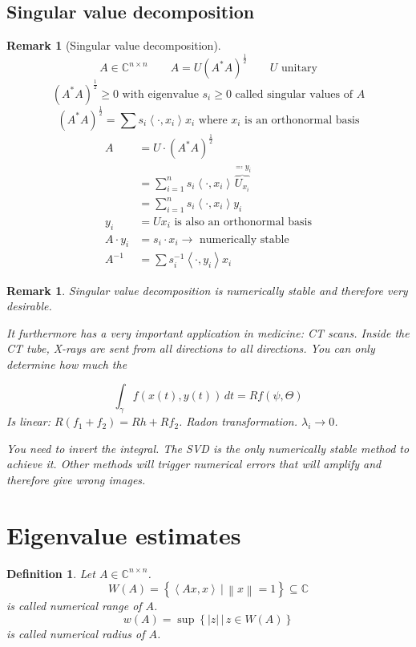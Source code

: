 \documentclass{article}
\newcounter{lecref}[section]
\numberwithin{lecref}{section}
\newtheorem{definition}[lecref]{Definition}
\newtheorem{remark}[lecref]{Remark}
\newcommand{\setdef}[2]{\left\{\left.#1\,\right|\,#2\right\}}
\newcommand{\angel}[1]{\left\langle#1\right\rangle}
\newcommand{\norm}[1]{\left\|#1\right\|}
\newcommand{\card}[1]{\left|#1\right|}
\begin{document}
\subsection{Singular value decomposition}

\begin{remark}[Singular value decomposition]
  \[ A \in \mathbb C^{n \times n} \qquad A = U (A^* A)^{\frac12} \qquad U \text{ unitary} \]
  \[ (A^* A)^{\frac12} \geq 0 \text{ with eigenvalue } s_i \geq 0 \text{ called singular values of } A \]
  \[ (A^* A)^{\frac12} = \sum s_i \angel{\cdot, x_i} x_i \text{ where } x_i \text{ is an orthonormal basis} \]
  \begin{align*}
    A &= U \cdot (A^* A)^{\frac12} \\
      &= \sum_{i=1}^n s_i \angel{\cdot, x_i} \overbrace{U_{x_i}}^{\eqqcolon y_i} \\
      &= \sum_{i=1}^n s_i \angel{\cdot, x_i} y_i \\
    y_i &= U x_i \text{ is also an orthonormal basis} \\
    A \cdot y_i &= s_i \cdot x_i \to \text{ numerically stable} \\
    A^{-1} &= \sum s^{-1}_i \angel{\cdot, y_i} x_i
  \end{align*}
\end{remark}

\begin{remark}
  Singular value decomposition is numerically stable and therefore very desirable.

  It furthermore has a very important application in medicine: CT scans.
  Inside the CT tube, X-rays are sent from all directions to all directions.
  You can only determine how much the 

  \[ \int_{\gamma} f(x(t), y(t)) \,dt = Rf(\psi, \Theta) \]
  Is linear: $R(f_1 + f_2) = Rh + Rf_2$.
  Radon transformation. $\lambda_i \to 0$.

  You need to invert the integral. The SVD is the only numerically stable method to achieve it. Other methods will trigger numerical errors that will amplify and therefore give wrong images.
\end{remark}

\section{Eigenvalue estimates} %

\begin{definition} %
  Let $A \in \mathbb C^{n \times n}$.
  \[ W(A) = \setdef{\angel{Ax, x}}{\norm{x} = 1} \subseteq \mathbb C \]
  is called \emph{numerical range of $A$}.
  \[ w(A) = \sup\setdef{\card{z}}{z \in W(A)} \]
  is called \emph{numerical radius of $A$}.
\end{definition}
\end{document}
